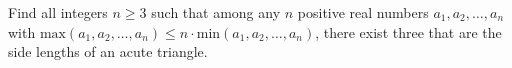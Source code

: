 Find all integers $n \geq 3$ such that among any $n$ positive real numbers $a_1, a_2, \hdots, a_n$ with $\text{max}(a_1,a_2,\hdots,a_n) \leq n \cdot \text{min}(a_1,a_2,\hdots,a_n)$, there exist three that are the side lengths of an acute triangle.